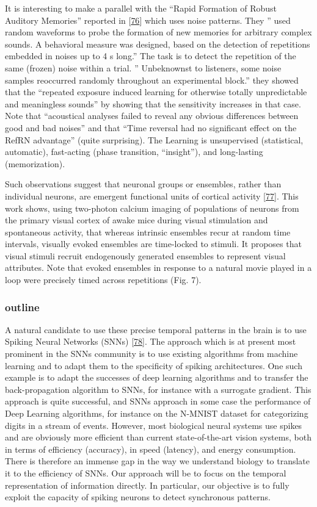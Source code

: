 It is interesting to make a parallel with the ``Rapid Formation of Robust Auditory Memories'' reported in {[}\protect\hyperlink{ref-Jzr1gwsr}{76}{]} which uses noise patterns. They '' used random waveforms to probe the formation of new memories for arbitrary complex sounds. A behavioral measure was designed, based on the detection of repetitions embedded in noises up to 4 s long.'' The task is to detect the repetition of the same (frozen) noise within a trial. '' Unbeknownst to listeners, some noise samples reoccurred randomly throughout an experimental block.'' they showed that the ``repeated exposure induced learning for otherwise totally unpredictable and meaningless sounds'' by showing that the sensitivity increases in that case. Note that ``acoustical analyses failed to reveal any obvious differences between good and bad noises'' and that ``Time reversal had no significant effect on the RefRN advantage'' (quite surprising). The Learning is unsupervised (statistical, automatic), fast-acting (phase transition, ``insight''), and long-lasting (memorization).

Such observations suggest that neuronal groups or ensembles, rather than individual neurons, are emergent functional units of cortical activity {[}\protect\hyperlink{ref-UGHHptIH}{77}{]}. This work shows, using two-photon calcium imaging of populations of neurons from the primary visual cortex of awake mice during visual stimulation and spontaneous activity, that whereas intrinsic ensembles recur at random time intervals, visually evoked ensembles are time-locked to stimuli. It proposes that visual stimuli recruit endogenously generated ensembles to represent visual attributes. Note that evoked ensembles in response to a natural movie played in a loop were precisely timed across repetitions (Fig. 7).

\hypertarget{outline}{%
\subsubsection{outline}\label{outline}}

A natural candidate to use these precise temporal patterns in the brain is to use Spiking Neural Networks (SNNs) {[}\protect\hyperlink{ref-DUpFdm8C}{78}{]}. The approach which is at present most prominent in the SNNs community is to use existing algorithms from machine learning and to adapt them to the specificity of spiking architectures. One such example is to adapt the successes of deep learning algorithms and to transfer the back-propagation algorithm to SNNs, for instance with a surrogate gradient. This approach is quite successful, and SNNs approach in some case the performance of Deep Learning algorithms, for instance on the N-MNIST dataset for categorizing digits in a stream of events. However, most biological neural systems use spikes and are obviously more efficient than current state-of-the-art vision systems, both in terms of efficiency (accuracy), in speed (latency), and energy consumption. There is therefore an immense gap in the way we understand biology to translate it to the efficiency of SNNs. Our approach will be to focus on the temporal representation of information directly. In particular, our objective is to fully exploit the capacity of spiking neurons to detect synchronous patterns.

